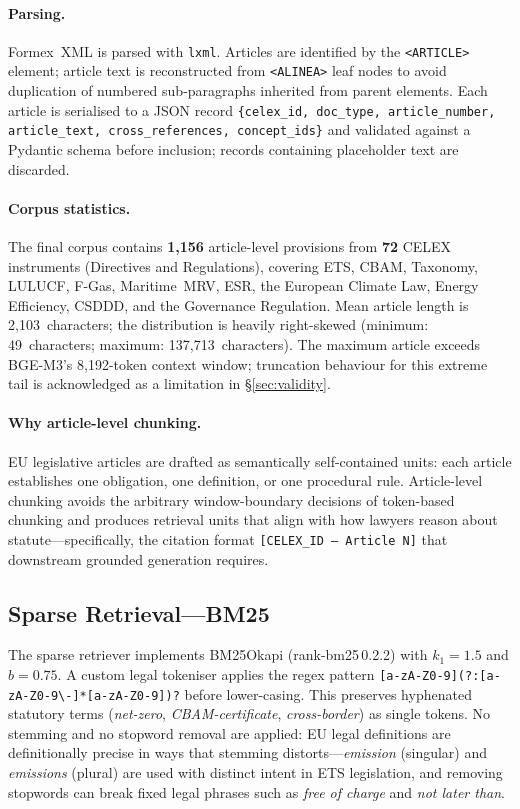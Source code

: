 \documentclass{iosart2x}
\newcommand{\bgem}{BGE-M3\xspace}
\begin{document}
\paragraph{Parsing.}  Formex~XML is parsed with \texttt{lxml}.
Articles are identified by the \texttt{<ARTICLE>} element; article
text is reconstructed from \texttt{<ALINEA>} leaf nodes to avoid
duplication of numbered sub-paragraphs inherited from parent
elements.  Each article is serialised to a JSON record
\texttt{\{celex\_id, doc\_type, article\_number, article\_text,
cross\_references, concept\_ids\}} and validated against a Pydantic
schema before inclusion; records containing placeholder text are
discarded.

\paragraph{Corpus statistics.}  The final corpus contains
\textbf{1,156} article-level provisions from \textbf{72} CELEX
instruments (Directives and Regulations), covering ETS, CBAM,
Taxonomy, LULUCF, F-Gas, Maritime~MRV, ESR, the European Climate Law,
Energy Efficiency, CSDDD, and the Governance Regulation.  Mean article
length is 2,103~characters; the distribution is heavily right-skewed
(minimum: 49~characters; maximum: 137,713~characters).  The maximum
article exceeds \bgem's 8,192-token context window; truncation
behaviour for this extreme tail is acknowledged as a limitation in
\S\ref{sec:validity}.

\paragraph{Why article-level chunking.}  EU legislative articles are
drafted as semantically self-contained units: each article establishes
one obligation, one definition, or one procedural rule.
Article-level chunking avoids the arbitrary window-boundary decisions
of token-based chunking and produces retrieval units that align with
how lawyers reason about statute---specifically, the citation format
\texttt{[CELEX\_ID\,---\,Article\,N]} that downstream grounded
generation requires.

\subsection{Sparse Retrieval---BM25}
\label{sec:sparse}

The sparse retriever implements BM25Okapi (rank-bm25\,0.2.2) with
$k_1{=}1.5$ and $b{=}0.75$.  A custom legal tokeniser applies the
regex pattern \texttt{[a-zA-Z0-9](?:[a-zA-Z0-9\textbackslash-]*[a-zA-Z0-9])?}
before lower-casing.  This preserves hyphenated statutory terms
(\textit{net-zero}, \textit{CBAM-certificate}, \textit{cross-border})
as single tokens.  No stemming and no stopword removal are applied:
EU legal definitions are definitionally precise in ways that stemming
distorts---\textit{emission} (singular) and \textit{emissions} (plural)
are used with distinct intent in ETS legislation, and removing
stopwords can break fixed legal phrases such as \textit{free of charge}
and \textit{not later than}.
\end{document}
